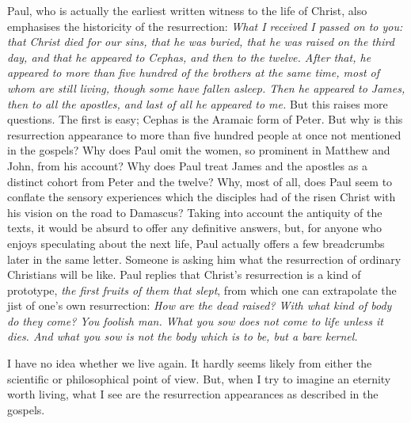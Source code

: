 Paul, who is actually the earliest written witness to the life of Christ, also emphasises the historicity of the resurrection: \textit{What I received I passed on to you: that Christ died for our sins, that he was buried, that he was raised on the third day, and that he appeared to Cephas, and then to the twelve. After that, he appeared to more than five hundred of the brothers at the same time, most of whom are still living, though some have fallen asleep. Then he appeared to James, then to all the apostles, and last of all he appeared to me.} But this raises more questions. The first is easy; Cephas is the Aramaic form of Peter. But why is this resurrection appearance to more than five hundred people at once not mentioned in the gospels? Why does Paul omit the women, so prominent in Matthew and John, from his account? Why does Paul treat James and the apostles as a distinct cohort from Peter and the twelve? Why, most of all, does Paul seem to conflate the sensory experiences which the disciples had of the risen Christ with his vision on the road to Damascus? Taking into account the antiquity of the texts, it would be absurd to offer any definitive answers, but, for anyone who enjoys speculating about the next life, Paul actually offers a few breadcrumbs later in the same letter. Someone is asking him what the resurrection of ordinary Christians will be like. Paul replies that Christ's resurrection is a kind of prototype, \textit{the first fruits of them that slept}, from which one can extrapolate the jist of one's own resurrection: \textit{How are the dead raised? With what kind of body do they come? You foolish man. What you sow does not come to life unless it dies. And what you sow is not the body which is to be, but a bare kernel.}

\prosesep

I have no idea whether we live again. It hardly seems likely from either the scientific or philosophical point of view. But, when I try to imagine an eternity worth living, what I see are the resurrection appearances as described in the gospels.
